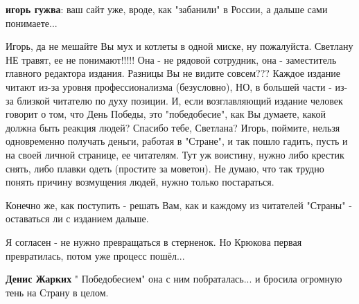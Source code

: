 \begin{itemize}
\begin{itemize}
\textbf{игорь гужва}: ваш сайт уже, вроде, как "забанили" в России, а дальше сами понимаете...
\end{itemize}

 

Игорь, да не мешайте Вы мух и котлеты в одной миске, ну пожалуйста. Светлану НЕ
травят, ее не понимают!!!!! Она - не рядовой сотрудник, она - заместитель
главного редактора издания. Разницы Вы не видите совсем??? Каждое издание
читают из-за уровня профессионализма (безусловно), НО, в большей части - из-за
близкой читателю по духу позиции. И, если возглавляющий издание человек говорит
о том, что День Победы, это "победобесие", как Вы думаете, какой должна быть
реакция людей? Спасибо тебе, Светлана? Игорь, поймите, нельзя одновременно
получать деньги, работая в "Стране", и так пошло гадить, пусть и на своей
личной странице, ее читателям. Тут уж воистину, нужно либо крестик снять, либо
плавки одеть (простите за моветон). Не думаю, что так трудно понять причину
возмущения людей, нужно только постараться.

Конечно же, как поступить - решать Вам, как и каждому из читателей "Страны" -
оставаться ли с изданием дальше.


 

Я согласен - не нужно превращаться в стерненок. Но Крюкова первая превратилась,
потом уже процесс пошёл...

\begin{itemize}
 
\textbf{Денис Жарких} " Победобесием" она с ним побраталась... и бросила огромную тень на Страну в целом.
\end{itemize}

 


\end{itemize}
